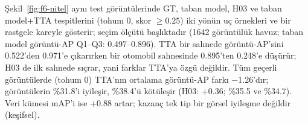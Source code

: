 

Şekil~\ref{fig:f6-nitel} aynı test görüntülerinde GT, taban model, H03 ve taban model+TTA tespitlerini (tohum 0, skor $\ge0.25$) iki yönün uç örnekleri ve bir rastgele kareyle gösterir; seçim ölçütü başlıktadır (1642 görüntülük havuz; taban model görüntü-AP Q1--Q3: 0.497--0.896). TTA bir sahnede görüntü-AP'sini 0.522'den 0.971'e çıkarırken bir otomobil sahnesinde 0.895'ten 0.248'e düşürür; H03 de ilk sahnede sıçrar, yani farklar TTA'ya özgü değildir. Tüm geçerli görüntülerde (tohum 0) TTA'nın ortalama görüntü-AP farkı $-$1.26'dır; görüntülerin \%31.8'i iyileşir, \%38.4'ü kötüleşir (H03: +0.36; \%35.5 ve \%34.7). Veri kümesi mAP'i ise +0.88 artar; kazanç tek tip bir görsel iyileşme değildir (keşifsel).

\FloatBarrier
